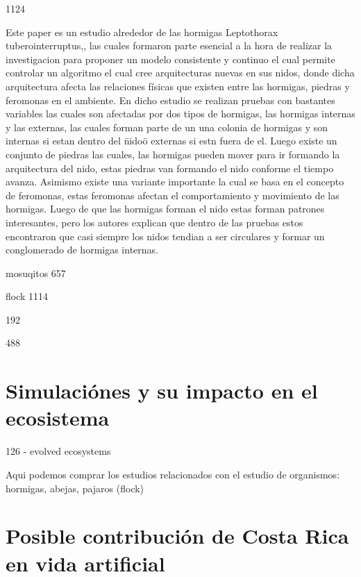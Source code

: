 \documentclass[conference]{IEEEtran}
\begin{document}
1124

Este paper es un estudio alrededor de las hormigas  Leptothorax tuberointerruptus,\cite{LP01}, las cuales formaron parte esencial a la hora de realizar la investigaci\’on para proponer un modelo consistente y continuo el cual permite controlar un algoritmo el cual cree arquitecturas nuevas en sus nidos, donde dicha arquitectura afecta las relaciones f\'isicas que existen entre las hormigas, piedras y feromonas en el ambiente.
En dicho estudio se realizan pruebas con bastantes variables las cuales son afectadas por dos tipos de hormigas, las hormigas internas y las externas, las cuales forman parte de un una colonia de hormigas y son internas si est\’an dentro del \"nido\" o externas si est\’n fuera de \’el. Luego existe un conjunto de piedras las cuales, las hormigas pueden mover para ir formando la arquitectura del nido, estas piedras van formando el nido conforme el tiempo avanza. Asimismo existe una variante importante la cual se basa en el concepto de feromonas, estas feromonas afectan el comportamiento y movimiento de las hormigas.\cite{LP01}
Luego de que las hormigas forman el nido estas forman patrones interesantes, pero los autores explican que dentro de las pruebas estos encontraron que casi siempre los nidos tendi\’an a ser circulares y formar un conglomerado de hormigas internas. 

mosuqitos 657

flock 1114

192

488




\section{Simulaci\'ones y su impacto en el ecosistema}


126 - evolved ecosystems

Aqui podemos comprar los estudios relacionados con el estudio de organismos: hormigas, abejas, pajaros (flock) 

\section{Posible contribuci\'on de Costa Rica en vida artificial}

\end{document}
